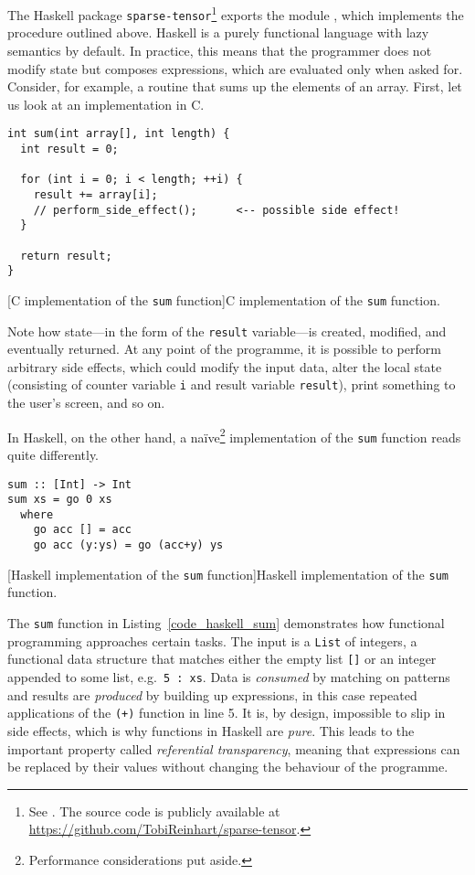 The Haskell package \texttt{sparse-tensor}\footnote{See \cite{Reinhart_2019_sparse-tensor}. The source code is publicly available at \url{https://github.com/TobiReinhart/sparse-tensor}.} exports the module \texttt{}, which implements the procedure outlined above. Haskell is a purely functional language with lazy semantics by default. \cite{Marlow_2010} In practice, this means that the programmer does not modify state but composes expressions, which are evaluated only when asked for. Consider, for example, a routine that sums up the elements of an array. First, let us look at an implementation in C.
\begin{code}
  \begin{verbatim}
int sum(int array[], int length) {
  int result = 0;

  for (int i = 0; i < length; ++i) {
    result += array[i];
    // perform_side_effect();      <-- possible side effect!
  }

  return result;
}
  \end{verbatim}
  [C implementation of the \texttt{sum} function]{C implementation of the \texttt{sum} function.}
\end{code}
Note how state---in the form of the \texttt{result} variable---is created, modified, and eventually returned. At any point of the programme, it is possible to perform arbitrary side effects, which could modify the input data, alter the local state (consisting of counter variable \texttt{i} and result variable \texttt{result}), print something to the user's screen, and so on.

In Haskell, on the other hand, a na\"ive\footnote{Performance considerations put aside.} implementation of the \texttt{sum} function reads quite differently.
\begin{code}
  \begin{verbatim}
sum :: [Int] -> Int
sum xs = go 0 xs
  where
    go acc [] = acc
    go acc (y:ys) = go (acc+y) ys
  \end{verbatim}
  [Haskell implementation of the \texttt{sum} function]{Haskell implementation of the \texttt{sum} function.}
  \label{code_haskell_sum}
\end{code}
The \texttt{sum} function in Listing~\ref{code_haskell_sum} demonstrates how functional programming approaches certain tasks. The input is a \texttt{List} of integers, a functional data structure that matches either the empty list \texttt{[]} or an integer appended to some list, e.g.\ \texttt{5 : xs}. Data is \emph{consumed} by matching on patterns and results are \emph{produced} by building up expressions, in this case repeated applications of the \texttt{(+)} function in line 5. It is, by design, impossible to slip in side effects, which is why functions in Haskell are \emph{pure}. This leads to the important property called \emph{referential transparency}, meaning that expressions can be replaced by their values without changing the behaviour of the programme.

